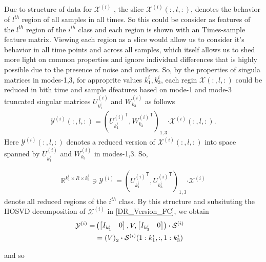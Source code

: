 \documentclass[journal]{IEEEtran}
\newcommand{\trans}{\mathsf{T}}
\begin{document}
{	Due to structure of data for $\mathcal{X}^{(i)}$ , the slice $\mathcal{X}^{(i)}(:,l,:)$, denotes
	the  behavior of $l^{th}$  region of all samples in all times. So this could be consider as features of the $l^{th}$ region  of the $i^{th}$ class and each region is shown with an Times-sample feature matrix. Viewing each region as a slice would allow us to consider it's behavior in all time points and across all samples, which itself allows us to shed more light on common properties and ignore individual differences that is highly possible due to the presence of noise and outliers.
	So, by the properties of singula matrices in modes-1,3, for approprite values
	$k_1^i,k_3^i$, each regin $\mathcal{X}(:,l,:)$ could be reduced in bith time and sample dfeatures
	based on mode-1 and mode-3 truncated  singular matrices $U_{k_1^i}^{(i)}$ and $W_{k_3}^{(i)}$
	as follows
	\begin{eqnarray}
	\mathcal{Y}^{(i)}(:,l,:) = \left( 
	{U_{k_1^i}^{(i)}}^{\trans},  {W_{k_3}^{(i)}}^{\trans} 
	\right)_{1,3} \boldsymbol{\cdot} \mathcal{X}^{(i)}(:,l,:).
	\end{eqnarray}
	Here $\mathcal{Y}^{(i)}(:,l,:)$  denotes a reduced version of $\mathcal{X}^{(i)}(:,l,:)$ into space
	spanned by $U_{k_1^i}^{(i)}$ and $W_{k_3}^{(i)}$ in modes-1,3. So,
	
	\begin{align}
	\mathbb{R}^{k_1^i \times R \times k_3^i} \ni  {{\mathcal{Y}^{(i)}}} = \left( 
	{U_{k_1^i}^{(i)}}^{\trans}, {U_{k^i_3}^{(i)}}^{\trans} 
	\right)_{1,3}\boldsymbol{\cdot} \mathcal{X}^{(i)} \label{DR_Version_FC}
	\end{align} 
	denote all reduced regions of the $i^{th}$ class. By this structure  and subsituting the HOSVD decomposition of $\mathcal{X}^{(i)}$ in \eqref{DR_Version_FC},  we obtain
	\begin{align}
	{\mathcal{Y}}^{(i)}= & \notag
	\left(
	\begin{bmatrix}
	I_{k_1^i} &  0
	\end{bmatrix},
	V,
	\begin{bmatrix}
	I_{k_3^i} &  0
	\end{bmatrix}
	\right)\boldsymbol{\cdot} \mathcal{S}^{(i)} \notag
	\\&=\left( 
	V
	\right)_{2} \boldsymbol{\cdot} \mathcal{S}^{(i)}(1:k_1^i,:, 1:k_3^i) \notag &
	\end{align}
	
	and so
	
}
\end{document}
